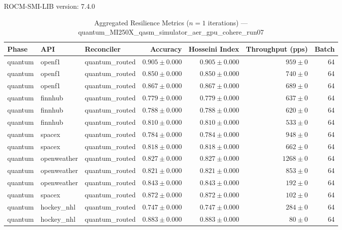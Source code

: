 ROCM-SMI-LIB version: 7.4.0

\begin{table}[htbp]
\caption{Aggregated Resilience Metrics ($n=1$ iterations) --- quantum_MI250X_qasm_simulator_aer_gpu_cohere_run07}
\begin{tabular}{l l l r r r r}
\hline
Phase & API & Reconciler & Accuracy & Hosseini Index & Throughput (pps) & Batch \\
\hline
quantum & openf1 & quantum\_routed & $0.905\pm0.000$ & $0.905\pm0.000$ & $959\pm0$ & 64 \\
quantum & openf1 & quantum\_routed & $0.850\pm0.000$ & $0.850\pm0.000$ & $740\pm0$ & 64 \\
quantum & openf1 & quantum\_routed & $0.867\pm0.000$ & $0.867\pm0.000$ & $689\pm0$ & 64 \\
quantum & finnhub & quantum\_routed & $0.779\pm0.000$ & $0.779\pm0.000$ & $637\pm0$ & 64 \\
quantum & finnhub & quantum\_routed & $0.788\pm0.000$ & $0.788\pm0.000$ & $620\pm0$ & 64 \\
quantum & finnhub & quantum\_routed & $0.810\pm0.000$ & $0.810\pm0.000$ & $533\pm0$ & 64 \\
quantum & spacex & quantum\_routed & $0.784\pm0.000$ & $0.784\pm0.000$ & $948\pm0$ & 64 \\
quantum & spacex & quantum\_routed & $0.818\pm0.000$ & $0.818\pm0.000$ & $662\pm0$ & 64 \\
quantum & openweather & quantum\_routed & $0.827\pm0.000$ & $0.827\pm0.000$ & $1268\pm0$ & 64 \\
quantum & openweather & quantum\_routed & $0.821\pm0.000$ & $0.821\pm0.000$ & $853\pm0$ & 64 \\
quantum & openweather & quantum\_routed & $0.843\pm0.000$ & $0.843\pm0.000$ & $192\pm0$ & 64 \\
quantum & spacex & quantum\_routed & $0.872\pm0.000$ & $0.872\pm0.000$ & $102\pm0$ & 64 \\
quantum & hockey\_nhl & quantum\_routed & $0.747\pm0.000$ & $0.747\pm0.000$ & $284\pm0$ & 64 \\
quantum & hockey\_nhl & quantum\_routed & $0.883\pm0.000$ & $0.883\pm0.000$ & $80\pm0$ & 64 \\

\end{tabular}
\end{table}
